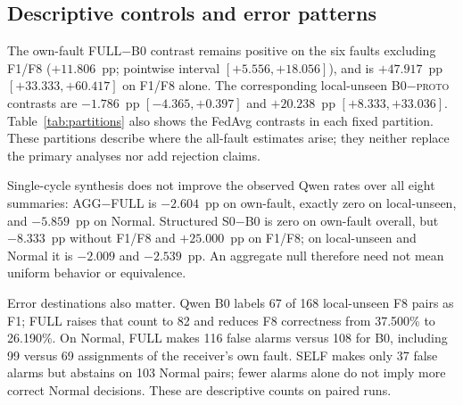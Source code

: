 \documentclass[conference]{IEEEtran}
\newcommand{\PROTO}{\textsc{proto}}
\newcommand{\cond}[1]{\textsf{#1}}
\begin{document}
\begin{table}[t]
\centering\footnotesize
\caption{Exploratory gpt-oss accuracy at the planned denominators: 192 own-fault, 1,344 local-unseen and 512 Normal pairs per arm. Abstentions out of 2,048 remain non-correct; no rejected, truncated or missing responses occurred.}
\label{tab:supplement}
\setlength{\tabcolsep}{3pt}

\end{table}

\subsection{Descriptive controls and error patterns}
The own-fault \cond{FULL}$-$\cond{B0} contrast remains positive on the six faults excluding F1/F8 ($+11.806$~pp; pointwise interval $[+5.556,+18.056]$), and is $+47.917$~pp $[+33.333,+60.417]$ on F1/F8 alone. The corresponding local-unseen \cond{B0}$-$\PROTO{} contrasts are $-1.786$~pp $[-4.365,+0.397]$ and $+20.238$~pp $[+8.333,+33.036]$. Table~\ref{tab:partitions} also shows the FedAvg contrasts in each fixed partition. These partitions describe where the all-fault estimates arise; they neither replace the primary analyses nor add rejection claims.

\begin{table}[t]
\centering\footnotesize
\caption{Qwen descriptive fault-partition contrasts (pp), weighting included faults equally: 192, 144 and 48 physical runs. No additional hypothesis tests.}
\label{tab:partitions}
\setlength{\tabcolsep}{3pt}

\end{table}

Single-cycle synthesis does not improve the observed Qwen rates over all eight summaries: \cond{AGG}$-$\cond{FULL} is $-2.604$~pp on own-fault, exactly zero on local-unseen, and $-5.859$~pp on Normal. Structured \cond{S0}$-$\cond{B0} is zero on own-fault overall, but $-8.333$~pp without F1/F8 and $+25.000$~pp on F1/F8; on local-unseen and Normal it is $-2.009$ and $-2.539$~pp. An aggregate null therefore need not mean uniform behavior or equivalence.

Error destinations also matter. Qwen \cond{B0} labels 67 of 168 local-unseen F8 pairs as F1; \cond{FULL} raises that count to 82 and reduces F8 correctness from 37.500\% to 26.190\%. On Normal, \cond{FULL} makes 116 false alarms versus 108 for \cond{B0}, including 99 versus 69 assignments of the receiver's own fault. \cond{SELF} makes only 37 false alarms but abstains on 103 Normal pairs; fewer alarms alone do not imply more correct Normal decisions. These are descriptive counts on paired runs.
\end{document}
